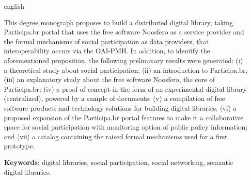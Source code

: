 \begin{resumo}[Abstract]
  \begin{otherlanguage*}{english} 
  
  
This degree monograph proposes to build a distributed digital library, taking Participa.br portal that uses the free software Noosfero as a service provider and the formal mechanisms of social participation as data providers, that interoperability occurs via the OAI-PMH.
%
In addition, to identify the aforementioned proposition, the following preliminary results were generated: (i) a theoretical study about social participation; (ii) an introduction to Participa.br, (iii) an explanatory study about the free software Noosfero, the core of Participa.br; (iv) a proof of concept in the form of an experimental digital library (centralized), powered by a sample of documents; (v) a compilation of free software products and technology solutions for building digital libraries; (vi) a proposed expansion of the Participa.br portal features to make it a collaborative space for social participation with monitoring option of public policy information; and (vii) a catalog containing the raised formal mechanisms used for a first prototype.

  
  \vspace{\onelineskip}
 
  \noindent 
  \textbf{Keywords}: digital libraries, social participation, social networking, semantic digital libraries.
  \end{otherlanguage*}
\end{resumo}


